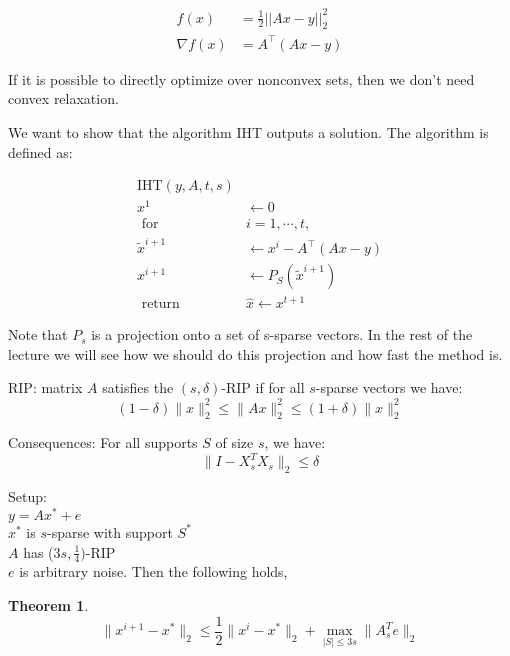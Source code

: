 \documentclass{article}
\theoremstyle{definition}
\newtheorem{theorem}{Theorem}
\begin{document}
\begin{align}
f(x) &= \frac{1}{2} || Ax - y||_2^2 \\
\nabla f(x) &= A^{\top}(Ax - y)
\end{align}

If it is possible to directly optimize over nonconvex sets, then we don't need convex relaxation.

We want to show that the algorithm IHT outputs a solution. The algorithm is defined as:

\begin{align*}
\text{IHT}(y, A, t, s) \\
x^1 &\leftarrow 0 \\
\text{ for } &i=1 ,\cdots, t, \\
\tilde{x}^{i+1} &\leftarrow x^i - A^{\top} (Ax - y) \\
x^{i+1} &\leftarrow P_S( \tilde{x}^{i+1} ) \\
\text{ return }& \hat{x} \leftarrow x^{t+1}
\end{align*}

Note that $P_s$ is a projection onto a set of s-sparse vectors. In the rest of the lecture we will see how we should do this projection and how fast the method is.

RIP: matrix $A$ satisfies the $(s,\delta)$-RIP if for all $s$-sparse vectors we have:
$$(1-\delta) \|x\|_2^2 \leq \|Ax\|_2^2 \leq (1+\delta)\|x\|_2^2$$

Consequences: For all supports $S$ of size $s$, we have:
$$\|I-X_s^TX_s\|_2 \leq \delta$$

Setup: \\
$y = Ax^* + e$ \\
$x^*$ is $s$-sparse with support $S^*$ \\ 
$A$ has ($3s,\frac{1}{4})$-RIP \\
$e$ is arbitrary noise.
Then the following holds,
\begin{theorem}
$$\|x^{i+1}-x^*\|_2 \leq \frac{1}{2} \|x^{i}-x^*\|_2 + \max_{|S| \leq 3s} \|A_s^T e\|_2$$
\end{theorem}
\end{document}
